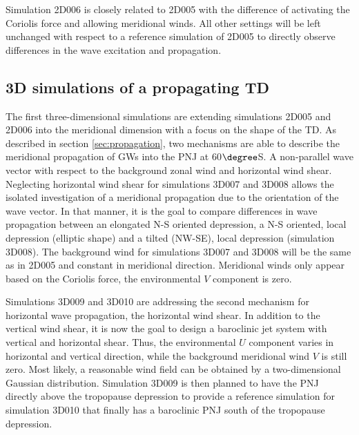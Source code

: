 Simulation 2D006 is closely related to 2D005 with the difference of activating the Coriolis force and allowing meridional winds. All other settings will be left unchanged with respect to a reference simulation of 2D005 to directly observe differences in the wave excitation and propagation.  






\subsection{3D simulations of a propagating TD}
\label{sec:3D}

The first three-dimensional simulations are extending simulations 2D005 and 2D006 into the meridional dimension with a focus on the shape of the TD. As described in section \ref{sec:propagation}, two mechanisms are able to describe the meridional propagation of GWs into the PNJ at 60$\degree$S. A non-parallel wave vector with respect to the background zonal wind and horizontal wind shear. Neglecting horizontal wind shear for simulations 3D007 and 3D008 allows the isolated investigation of a meridional propagation due to the orientation of the wave vector. In that manner, it is the goal to compare differences in wave propagation between an elongated N-S oriented depression, a N-S oriented, local depression (elliptic shape) and a tilted (NW-SE), local depression (simulation 3D008). The background wind for simulations 3D007 and 3D008 will be the same as in 2D005 and constant in meridional direction. Meridional winds only appear based on the Coriolis force, the environmental $V$ component is zero. 

Simulations 3D009 and 3D010 are addressing the second mechanism for horizontal wave propagation, the horizontal wind shear. In addition to the vertical wind shear, it is now the goal to design a baroclinic jet system with vertical and horizontal shear. Thus, the environmental $U$ component varies in horizontal and vertical direction, while the background meridional wind $V$ is still zero. Most likely, a reasonable wind field can be obtained by a two-dimensional Gaussian distribution. Simulation 3D009 is then planned to have the PNJ directly above the tropopause depression to provide a reference simulation for simulation 3D010 that finally has a baroclinic PNJ south of the tropopause depression. 

